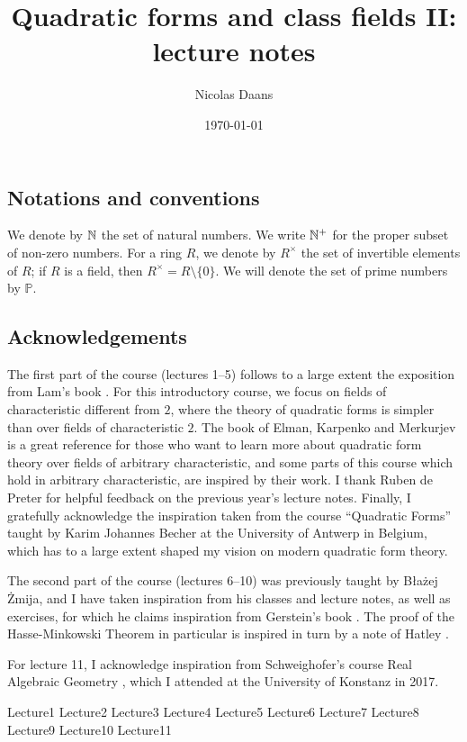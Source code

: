 \documentclass[12pt, leqno, british]{amsart}
\title{Quadratic forms and class fields II: lecture notes}
\author{Nicolas Daans}
\date{\today}
\begin{document}
\maketitle
\tableofcontents

\subsection*{Notations and conventions}
We denote by $\mathbb N$ the set of natural numbers.
We write $\mathbb N^+$ for the proper subset of non-zero numbers.
For a ring $R$, we denote by $R^\times$ the set of invertible elements of $R$; if $R$ is a field, then $R^\times = R \setminus \lbrace 0 \rbrace$.
We will denote the set of prime numbers by $\mathbb{P}$.

\subsection*{Acknowledgements}
The first part of the course (lectures 1--5) follows to a large extent the exposition from Lam's book \autocite{Lam}.
For this introductory course, we focus on fields of characteristic different from $2$, where the theory of quadratic forms is simpler than over fields of characteristic $2$.
The book of Elman, Karpenko and Merkurjev \autocite{ElmanKarpenkoMerkurjev} is a great reference for those who want to learn more about quadratic form theory over fields of arbitrary characteristic, and some parts of this course which hold in arbitrary characteristic, are inspired by their work.
I thank Ruben de Preter for helpful feedback on the previous year's lecture notes.
Finally, I gratefully acknowledge the inspiration taken from the course ``Quadratic Forms'' taught by Karim Johannes Becher at the University of Antwerp in Belgium, which has to a large extent shaped my vision on modern quadratic form theory.

The second part of the course (lectures 6--10) was previously taught by B{\l}a{\.z}ej {\.Z}mija, and I have taken inspiration from his classes and lecture notes, as well as exercises, for which he claims inspiration from Gerstein's book \cite{Gerstein}.
The proof of the Hasse-Minkowski Theorem in particular is inspired in turn by a note of Hatley \cite{Hat}.

For lecture 11, I acknowledge inspiration from Schweighofer's course Real Algebraic Geometry \cite[Section 1.6]{RAG}, which I attended at the University of Konstanz in 2017.

{Lecture1}
{Lecture2}
{Lecture3}
{Lecture4}
{Lecture5}
{Lecture6}
{Lecture7}
{Lecture8}
{Lecture9}
{Lecture10}
{Lecture11}

\printindex
\printbibliography
\end{document}
